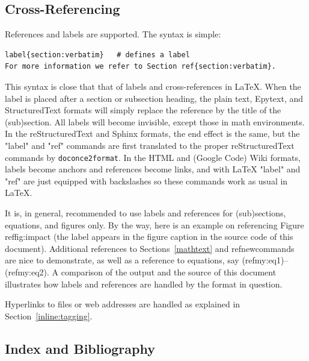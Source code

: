 \documentclass{article}
\begin{document}
\subsection{Cross-Referencing}

  

References and labels are supported. The syntax is simple:
\begin{Verbatim}[fontsize=\fontsize{9pt}{9pt},tabsize=8,baselinestretch=0.85,
fontfamily=tt,xleftmargin=7mm]
label{section:verbatim}   # defines a label
For more information we refer to Section ref{section:verbatim}.
\end{Verbatim}
\noindent
This syntax is close that that of labels and cross-references in
{\LaTeX}. When the label is placed after a section or subsection heading,
the plain text, Epytext, and StructuredText formats will simply
replace the reference by the title of the (sub)section.  All labels
will become invisible, except those in math environments.  In the
reStructuredText and Sphinx formats, the end effect is the same, but
the "label" and "ref" commands are first translated to the proper
reStructuredText commands by {\fontsize{10pt}{10pt}\verb!doconce2format!}. In the HTML and (Google
Code) Wiki formats, labels become anchors and references become links,
and with {\LaTeX} "label" and "ref" are just equipped with backslashes so
these commands work as usual in {\LaTeX}.

It is, in general, recommended to use labels and references for
(sub)sections, equations, and figures only.
By the way, here is an example on referencing Figure ref{fig:impact}
(the label appears in the figure caption in the source code of this document).
Additional references to Sections~\ref{mathtext} and ref{newcommands} are
nice to demonstrate, as well as a reference to equations,
say (ref{my:eq1})--(ref{my:eq2}). A comparison of the output and
the source of this document illustrates how labels and references
are handled by the format in question.

Hyperlinks to files or web addresses are handled as explained
in Section~\ref{inline:tagging}.

\subsection{Index and Bibliography}

  
\end{document}
